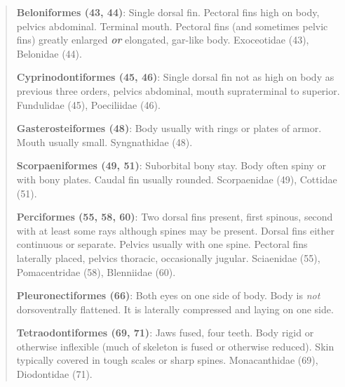 \documentclass[12pt, hidelinks]{exam}
\begin{document}
\begin{quote}
\textbf{Beloniformes (43, 44)}: Single dorsal fin. Pectoral fins high on
body, pelvics abdominal. Terminal mouth. Pectoral fins (and sometimes
pelvic fins) greatly enlarged \emph{\textbf{or}} elongated, gar-like
body. Exoceotidae (43), Belonidae (44).

\textbf{Cyprinodontiformes (45, 46)}: Single dorsal fin not as high on
body as previous three orders, pelvics abdominal, mouth supraterminal to
superior. Fundulidae (45), Poeciliidae (46).

\textbf{Gasterosteiformes (48)}: Body usually with rings or plates
of armor. Mouth usually small. Syngnathidae (48).

\textbf{Scorpaeniformes (49, 51)}: Suborbital bony stay. Body often
spiny or with bony plates. Caudal fin usually rounded. Scorpaenidae
(49), Cottidae (51).

\textbf{Perciformes (55, 58, 60)}: Two dorsal fins present, first
spinous, second with at least some rays although spines may be present.
Dorsal fins either continuous or separate. Pelvics usually with one
spine. Pectoral fins laterally placed, pelvics thoracic, occasionally
jugular. Sciaenidae (55), Pomacentridae (58), Blenniidae (60).%

\textbf{Pleuronectiformes (66)}: Both eyes on one side of body. Body is
\emph{not} dorsoventrally flattened. It is laterally compressed and laying on one side.

\textbf{Tetraodontiformes (69, 71)}: Jaws fused, four teeth. Body rigid
or otherwise inflexible (much of skeleton is fused or otherwise
reduced). Skin typically covered in tough scales or sharp spines.
Monacanthidae (69), Diodontidae (71).
\end{quote}
\end{document}
